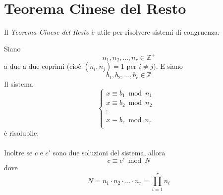 \documentclass[a4paper,12pt, oneside]{book}
\begin{document}
\section{Teorema Cinese del Resto}
Il \textit{Teorema Cinese del Resto} è utile per risolvere sistemi di congruenza.
\begin{teorema}
	Siano $$n_1, n_2, \dots , n_r \in \mathbb{Z}^+$$
	a due a due coprimi (cioè $(n_i, n_j)=1$ per $i \not = j$).
	E siano $$b_1, b_2, \dots , b_r \in \mathbb{Z}$$
	Il sistema
	$$\begin{cases}
			x \equiv b_1 \bmod n_1   \\
			x \equiv b_2 \bmod n_2 & \\
			\vdots                   \\
			x \equiv b_r \bmod n_r & \\
		\end{cases}$$
	è risolubile.\\\\
	Inoltre se $c$ e $c'$ sono due soluzioni del sistema, allora $$c \equiv c' \bmod N$$
	dove $$N = n_1 \cdot n_2 \cdot \dots \cdot n_r = \prod_{i = 1}^{r} n_i$$


\end{teorema}
\end{document}
